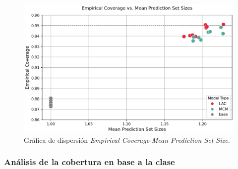 \begin{figure}[h]
    \centering
    \includegraphics[width=\textwidth]{capitulos/cap_05/imagenes/AMM_scatterplot_EC-MPSS.png}
    \caption[
        Gráfica de dispersión \textit{Empirical Coverage}-\textit{Mean Prediction Set Size}
    ]{
        Gráfica de dispersión \textit{Empirical Coverage}-\textit{Mean Prediction Set Size}. 
    }
    \label{fig:AMM_scatterplot_EC-MPSS}
\end{figure}

\FloatBarrier

\subsubsection{Análisis de la cobertura en base a la clase}


